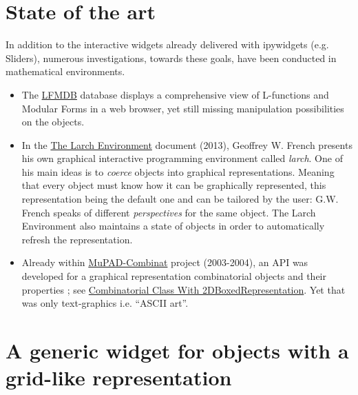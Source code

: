 \documentclass{deliverablereport}
\begin{document}
\section{State of the art}


In addition to the interactive widgets already delivered with ipywidgets (e.g. Sliders), numerous investigations, towards these goals, have been conducted in mathematical environments.

\begin{itemize}
\item The \href{http://www.lmfdb.org/}{LFMDB} database displays a comprehensive view of L-functions and Modular Forms in a web browser, yet still missing manipulation possibilities on the objects.
\item In the \href{https://core.ac.uk/download/pdf/9839511.pdf}{The
  Larch Environment} document (2013), Geoffrey W. French presents his own graphical
  interactive programming environment called \emph{larch}.
  One of his main ideas is to
  \emph{coerce} objects into graphical representations. Meaning that
  every object must know how it can be graphically represented, this
  representation being the default one and can be tailored by the
  user: G.W. French speaks of different \emph{perspectives} for the
  same object. The Larch Environment also maintains a state of objects
  in order to automatically refresh the representation.
\item Already within
  \href{http://mupad-combinat.sourceforge.net}{MuPAD-Combinat} project
  (2003-2004), an API was developed for a graphical representation combinatorial objects and their properties ; see \href{http://mupad-combinat.sourceforge.net/doc/en/Cat_Combinat/CombinatorialClassWith2DBoxedRepresentation.html}{Combinatorial Class With 2DBoxedRepresentation}. Yet that was only text-graphics i.e. ``ASCII art''.
\end{itemize}


\section{A generic widget for objects with a grid-like representation}
\label{grid}
\end{document}
